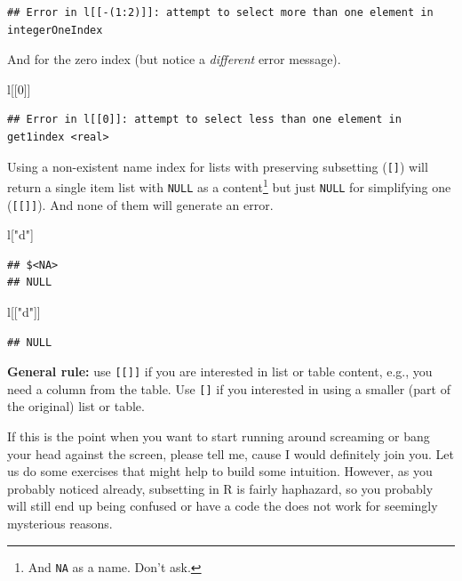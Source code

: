 \documentclass[
]{book}
\newenvironment{Shaded}{\begin{snugshade}}{\end{snugshade}}
\newcommand{\DecValTok}[1]{\textcolor[rgb]{0.00,0.00,0.81}{#1}}
\newcommand{\NormalTok}[1]{#1}
\newcommand{\StringTok}[1]{\textcolor[rgb]{0.31,0.60,0.02}{#1}}
\begin{document}
\begin{verbatim}
## Error in l[[-(1:2)]]: attempt to select more than one element in integerOneIndex
\end{verbatim}

And for the zero index (but notice a \emph{different} error message).

\begin{Shaded}
\begin{Highlighting}[]
\NormalTok{l[[}\DecValTok{0}\NormalTok{]]}
\end{Highlighting}
\end{Shaded}

\begin{verbatim}
## Error in l[[0]]: attempt to select less than one element in get1index <real>
\end{verbatim}

Using a non-existent name index for lists with preserving subsetting (\texttt{{[}{]}}) will return a single item list with \texttt{NULL} as a content\footnote{And \texttt{NA} as a name. Don't ask.} but just \texttt{NULL} for simplifying one (\texttt{{[}{[}{]}{]}}). And none of them will generate an error.

\begin{Shaded}
\begin{Highlighting}[]
\NormalTok{l[}\StringTok{"d"}\NormalTok{]}
\end{Highlighting}
\end{Shaded}

\begin{verbatim}
## $<NA>
## NULL
\end{verbatim}

\begin{Shaded}
\begin{Highlighting}[]
\NormalTok{l[[}\StringTok{"d"}\NormalTok{]]}
\end{Highlighting}
\end{Shaded}

\begin{verbatim}
## NULL
\end{verbatim}

\textbf{General rule:} use \texttt{{[}{[}{]}{]}} if you are interested in list or table content, e.g., you need a column from the table. Use \texttt{{[}{]}} if you interested in using a smaller (part of the original) list or table.

If this is the point when you want to start running around screaming or bang your head against the screen, please tell me, cause I would definitely join you. Let us do some exercises that might help to build some intuition. However, as you probably noticed already, subsetting in R is fairly haphazard, so you probably will still end up being confused or have a code the does not work for seemingly mysterious reasons.
\end{document}
